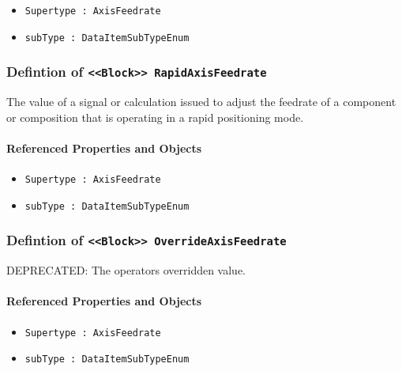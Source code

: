 \begin{itemize}
\item \texttt{Supertype : AxisFeedrate}

\item \texttt{subType : DataItemSubTypeEnum}

\end{itemize}
\FloatBarrier
\subsubsection{Defintion of \texttt{<<Block>> RapidAxisFeedrate}}
  \label{type:RapidAxisFeedrate}

\FloatBarrier

The value of a signal or calculation issued to adjust the feedrate of a component or composition that is operating in a rapid positioning mode.

\FloatBarrier
\paragraph{Referenced Properties and Objects}

\begin{itemize}
\item \texttt{Supertype : AxisFeedrate}

\item \texttt{subType : DataItemSubTypeEnum}

\end{itemize}
\FloatBarrier
\subsubsection{Defintion of \texttt{<<Block>> OverrideAxisFeedrate}}
  \label{type:OverrideAxisFeedrate}

\FloatBarrier

DEPRECATED: The operators overridden value.

\FloatBarrier
\paragraph{Referenced Properties and Objects}

\begin{itemize}
\item \texttt{Supertype : AxisFeedrate}

\item \texttt{subType : DataItemSubTypeEnum}

\end{itemize}
\FloatBarrier
